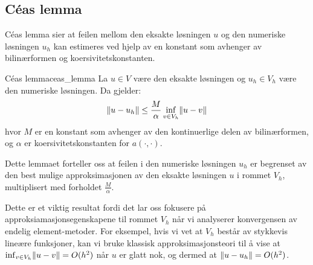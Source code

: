 \documentclass[../main.tex]{subfiles}
\begin{document}
\subsection{Céas lemma}
Céas lemma sier at feilen mellom den eksakte løsningen $u$ og den numeriske løsningen $u_h$ kan estimeres ved hjelp av en konstant som avhenger av bilinærformen og koersivitetskonstanten.

\begin{lemma}{Céas lemma}{ceas_lemma}
	La $u \in V$ være den eksakte løsningen og $u_h \in V_h$ være den numeriske løsningen. Da gjelder:
	\[
		\norm*{u - u_h} \leq \frac{M}{\alpha} \inf_{v \in V_h} \norm*{u - v}
	\]
	hvor $M$ er en konstant som avhenger av den kontinuerlige delen av bilinærformen, og $\alpha$ er koersivitetskonstanten for $a(\cdot,\cdot)$.
\end{lemma}

Dette lemmaet forteller oss at feilen i den numeriske løsningen $u_h$ er begrenset av den best mulige approksimasjonen av den eksakte løsningen $u$ i rommet $V_h$, multiplisert med forholdet $\frac{M}{\alpha}$.

Dette er et viktig resultat fordi det lar oss fokusere på approksiamasjonsegenskapene til rommet $V_h$ når vi analyserer konvergensen av endelig element-metoder. For eksempel, hvis vi vet at $V_h$ består av stykkevis lineære funksjoner, kan vi bruke klassisk approksimasjonsteori til å vise at $\inf_{v \in V_h} \norm*{u - v} = O(h^2)$ når $u$ er glatt nok, og dermed at $\norm*{u - u_h} = O(h^2)$.
\end{document}
